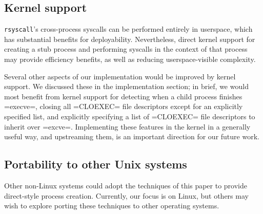 \documentclass[letterpaper,twocolumn,10pt]{article}
\begin{document}
\subsection{Kernel support}
\texttt{rsyscall}'s cross-process syscalls can be performed entirely in userspace,
which has substantial benefits for deployability.
Nevertheless, direct kernel support for creating a stub process and performing syscalls in the context of that process
may provide efficiency benefits, as well as reducing userspace-visible complexity.

Several other aspects of our implementation would be improved by kernel support.
We discussed these in the implementation section;
in brief, we would most benefit from kernel support for
detecting when a child process finishes =execve=,
closing all =CLOEXEC= file descriptors except for an explicitly specified list,
and explicitly specifying a list of =CLOEXEC= file descriptors to inherit over =excve=.
Implementing these features in the kernel in a generally useful way, and upstreaming them,
is an important direction for our future work.
\subsection{Portability to other Unix systems}
Other non-Linux systems
could adopt the techniques of this paper
to provide direct-style process creation.
Currently, our focus is on Linux,
but others may wish to explore porting these techniques to other operating systems.
\end{document}
